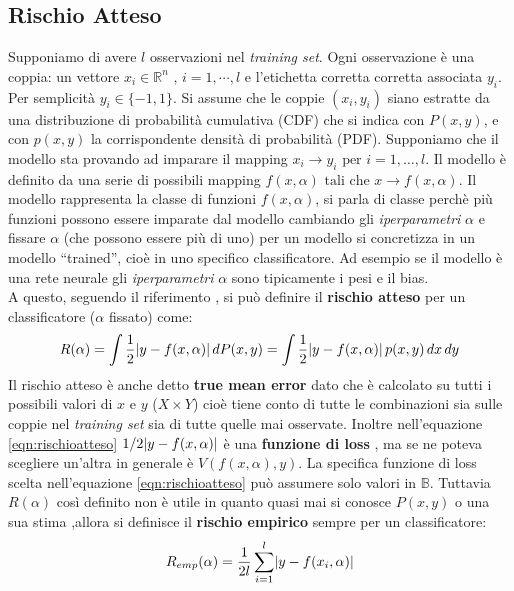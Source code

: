 \subsection{Rischio Atteso}
Supponiamo di avere $l$ osservazioni nel \textit{training set}. Ogni osservazione è una coppia: un vettore $x_{i} \in \mathbb{R}^{n} \text{ , } i=1,\cdots,l$ e l'etichetta corretta corretta associata $y_{i}$. Per semplicità $y_{i} \in \{-1,1\}$. Si assume che le coppie $(x_i,y_i)$ siano estratte da una distribuzione di probabilità cumulativa (CDF) che si indica con $P(x,y)$,  e con $p(x,y)$ la corrispondente densità di probabilità (PDF).  Supponiamo che il modello sta provando ad imparare il mapping $x_i \to y_i \text{ per } i=1,\dots,l$.  Il modello è definito da una serie di possibili mapping $f(x,\alpha) \text{ tali che } x \to f(x,\alpha) $. Il modello rappresenta la classe di funzioni $f(x,\alpha) $, si parla di classe perchè più funzioni possono essere imparate dal modello cambiando gli \textit{iperparametri} $\alpha$ e fissare $\alpha$ (che possono essere più di uno) per un modello si concretizza in un modello ``trained'', cioè in uno specifico classificatore. Ad esempio se il modello è una rete neurale gli \textit{iperparametri} $\alpha$ sono tipicamente i pesi e il bias. \\A questo, seguendo il riferimento \cite{Vapnik95}, si può definire il \textbf{rischio atteso} per un classificatore ($\alpha$ fissato) come:
\begin{equation}
\label{eqn:rischioatteso}
R(\alpha) = \int \frac{1}{2} \lvert y-f(x,\alpha)\rvert \, dP(x,y) = \int \frac{1}{2} \lvert y-f(x,\alpha)\rvert \, p(x,y) \, dx \, dy
\end{equation}
Il rischio atteso è anche detto \textbf{true mean error}  dato che è calcolato su tutti i possibili valori di $x$ e $y$ ($X \times Y$) cioè tiene conto di tutte le combinazioni sia sulle coppie nel \textit{training set} sia di tutte quelle mai osservate. Inoltre nell'equazione \eqref{eqn:rischioatteso}  $1/2 \lvert y-f(x,\alpha)\rvert$ è una \textbf{funzione di loss} , ma se ne poteva scegliere un'altra in generale è $V(f(x,\alpha),y)$. La specifica funzione di loss scelta nell'equazione \eqref{eqn:rischioatteso} può assumere solo valori in $\mathbb{B}$. Tuttavia $R(\alpha)$ così definito non è utile in quanto quasi mai si conosce $P(x,y)$ o una sua stima ,allora si definisce il \textbf{rischio empirico} sempre per un classificatore:
\begin{equation*}
R_{emp}(\alpha) = \frac{1}{2l} \sum_{i=1}^{l}\lvert y-f(x_{i},\alpha)\rvert
\end{equation*}
